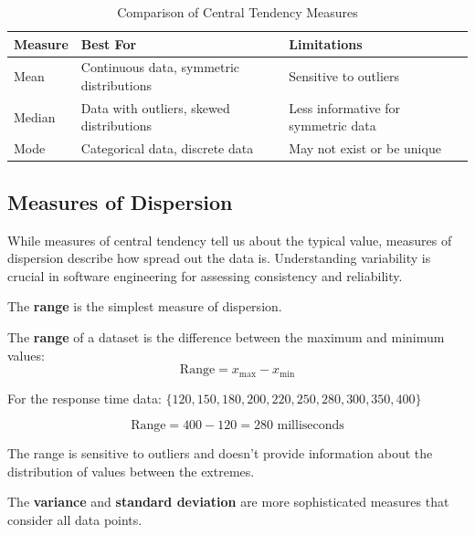 \begin{table}[h]
\centering
\renewcommand{\arraystretch}{1.4}
\begin{tabular}{|l|l|l|}
\hline
\textbf{Measure} & \textbf{Best For} & \textbf{Limitations} \\
\hline
Mean & Continuous data, symmetric distributions & Sensitive to outliers \\
\hline
Median & Data with outliers, skewed distributions & Less informative for symmetric data \\
\hline
Mode & Categorical data, discrete data & May not exist or be unique \\
\hline
\end{tabular}
\caption{Comparison of Central Tendency Measures}
\label{tab:central_tendency}
\end{table}

\subsection*{Measures of Dispersion}

While measures of central tendency tell us about the typical value, measures of dispersion describe how spread out the data is. Understanding variability is crucial in software engineering for assessing consistency and reliability.

The \textbf{range} is the simplest measure of dispersion.

\begin{definition}[Range]
The \textbf{range} of a dataset is the difference between the maximum and minimum values:
\[
\text{Range} = x_{\max} - x_{\min}
\]
\end{definition}

\begin{example}

    For the response time data: $\{120, 150, 180, 200, 220, 250, 280, 300, 350, 400\}$

\[
\text{Range} = 400 - 120 = 280 \text{ milliseconds}
\]
\end{example}

\begin{remark}
The range is sensitive to outliers and doesn't provide information about the distribution of values between the extremes.
\end{remark}

The \textbf{variance} and \textbf{standard deviation} are more sophisticated measures that consider all data points.

